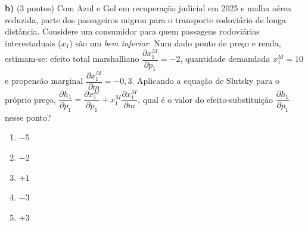 \textbf{b)} (3 pontos) Com Azul e Gol em recuperação judicial em 2025 e malha aérea reduzida, parte dos passageiros migrou para o transporte rodoviário de longa distância. Considere um consumidor para quem passagens rodoviárias interestaduais ($x_1$) são um \emph{bem inferior}. Num dado ponto de preço e renda, estimam-se: efeito total marshalliano $\dfrac{\partial x_1^{M}}{\partial p_1}=-2$, quantidade demandada $x_1^{M}=10$ e propensão marginal $\dfrac{\partial x_1^{M}}{\partial m}=-0{,}3$. Aplicando a equação de Slutsky para o próprio preço, $\dfrac{\partial h_1}{\partial p_1}=\dfrac{\partial x_1^{M}}{\partial p_1}+x_1^{M}\dfrac{\partial x_1^{M}}{\partial m}$, qual é o valor do efeito-substituição $\dfrac{\partial h_1}{\partial p_1}$ nesse ponto?

\begin{enumerate}[label=\Alph*., leftmargin=3.2em, itemsep=0.15em, topsep=0.2em]
  \item $-5$
  \item $-2$
  \item $+1$
  \item $-3$
  \item $+3$
\end{enumerate}

